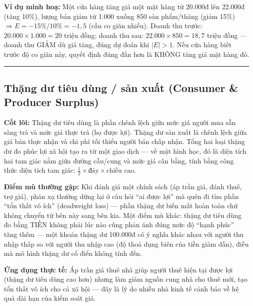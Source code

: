 \documentclass[
]{article}
\begin{document}
\textbf{Ví dụ minh hoạ:} Một cửa hàng tăng giá một mặt hàng từ 20.000đ
lên 22.000đ (tăng 10\%), lượng bán giảm từ 1.000 xuống 850 sản
phẩm/tháng (giảm 15\%) \(\Rightarrow E = -15\% / 10\% = -1{,}5\) (cầu co
giãn nhiều). Doanh thu trước: \(20.000 \times 1.000 = 20\) triệu đồng;
doanh thu sau: \(22.000 \times 850 = 18{,}7\) triệu đồng --- doanh thu
GIẢM dù giá tăng, đúng dự đoán khi \(|E| > 1\). Nếu cửa hàng biết trước
độ co giãn này, quyết định đúng đắn hơn là KHÔNG tăng giá mặt hàng đó.

\begin{center}\rule{0.5\linewidth}{0.5pt}\end{center}

\subsection{Thặng dư tiêu dùng / sản xuất (Consumer \& Producer
Surplus)}\label{thux1eb7ng-dux1b0-tiuxeau-duxf9ng-sux1ea3n-xuux1ea5t-consumer-producer-surplus}

\textbf{Cốt lõi:} Thặng dư tiêu dùng là phần chênh lệch giữa mức giá
người mua sẵn sàng trả và mức giá thực trả (họ được lợi). Thặng dư sản
xuất là chênh lệch giữa giá bán thực nhận và chi phí tối thiểu người bán
chấp nhận. Tổng hai loại thặng dư đo phúc lợi xã hội tạo ra từ một giao
dịch --- về mặt hình học, đó là diện tích hai tam giác nằm giữa đường
cầu/cung và mức giá cân bằng, tính bằng công thức diện tích tam giác:
\(\frac{1}{2} \times \text{đáy} \times \text{chiều cao}\).

\textbf{Điểm mù thường gặp:} Khi đánh giá một chính sách (áp trần giá,
đánh thuế, trợ giá), phản xạ thường dừng lại ở câu hỏi ``ai được lợi''
mà quên đi tìm phần ``tổn thất vô ích'' (deadweight loss) --- phần thặng
dư biến mất hoàn toàn chứ không chuyển từ bên này sang bên kia. Một điểm
mù khác: thặng dư tiêu dùng đo bằng TIỀN không phải lúc nào cũng phản
ánh đúng mức độ ``hạnh phúc'' tăng thêm --- một khoản thặng dư 100.000đ
có ý nghĩa khác nhau với người thu nhập thấp so với người thu nhập cao
(độ thoả dụng biên của tiền giảm dần), điều mà mô hình thặng dư cổ điển
không tính đến.

\textbf{Ứng dụng thực tế:} Áp trần giá thuê nhà giúp người thuê hiện tại
được lợi (thặng dư tiêu dùng cao hơn) nhưng làm giảm nguồn cung nhà cho
thuê mới, tạo tổn thất vô ích cho cả xã hội --- đây là lý do nhiều nhà
kinh tế cảnh báo về hệ quả dài hạn của kiểm soát giá.
\end{document}
